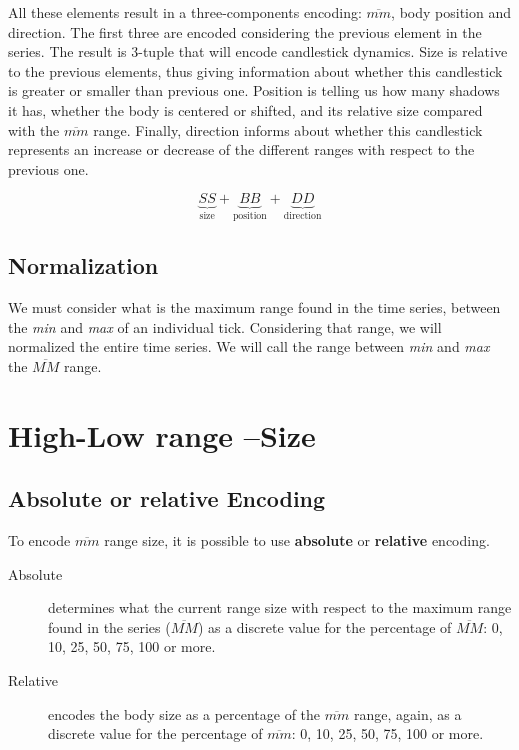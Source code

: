 \documentclass[]{article}
\begin{document}
All these elements result in a three-components encoding: $\overline{mm}$, body position and direction. The first three are encoded considering the previous element in the series. The result is 3-tuple that will encode candlestick dynamics. Size is relative to the previous elements, thus giving information about whether this candlestick is greater or smaller than previous one. Position is telling us how many shadows it has, whether the body is centered or shifted, and its relative size compared with the $\overline{mm}$ range. Finally, direction informs about whether this candlestick represents an increase or decrease of the different ranges with respect to the previous one.

\[
	\underbrace{SS}_\text{size} + \underbrace{BB}_\text{position} + \underbrace{DD}_\text{direction}
\]

\subsection{Normalization}

We must consider what is the maximum range found in the time series, between the \textit{min} and \textit{max} of an individual tick. Considering that range, we will normalized the entire time series. We will call the range between \textit{min} and \textit{max} the $\overline{MM}$ range. 

\section{High-Low range --Size}
\subsection{Absolute or relative Encoding}

To encode $\overline{mm}$ range size, it is possible to use \textbf{absolute} or \textbf{relative} encoding.
\begin{description}
	\item[Absolute] determines what the current range size with respect to the maximum range found in the series ($\overline{MM}$) as a discrete value for the percentage of $\overline{MM}$: 0, 10, 25, 50, 75, 100 or more.
	\item[Relative] encodes the body size as a percentage of the $\overline{mm}$ range, again, as a discrete value for the percentage of $\overline{mm}$: 0, 10, 25, 50, 75, 100 or more.
\end{description}
\end{document}
